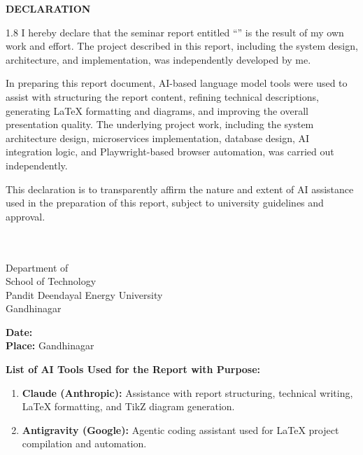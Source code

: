 \thispagestyle{empty}

\begin{center}
{\Large \textbf{DECLARATION}}
\end{center}

\vspace{1.0cm}

\begin{spacing}{1.8}
\noindent
I hereby declare that the seminar report entitled ``\projecttitle'' is the result of my own work and effort. The project described in this report, including the system design, architecture, and implementation, was independently developed by me.

\vspace{0.5cm}

\noindent
In preparing this report document, AI-based language model tools were used to assist with structuring the report content, refining technical descriptions, generating \LaTeX{} formatting and diagrams, and improving the overall presentation quality. The underlying project work, including the system architecture design, microservices implementation, database design, AI integration logic, and Playwright-based browser automation, was carried out independently.

\vspace{0.5cm}

\noindent
This declaration is to transparently affirm the nature and extent of AI assistance used in the preparation of this report, subject to university guidelines and approval.
\end{spacing}

\vspace{1.5cm}

\noindent
\textbf{\studentname} \\
\rollnumber \\
Department of \department \\
School of Technology \\
Pandit Deendayal Energy University \\
Gandhinagar

\vspace{1.0cm}

\noindent
\textbf{Date:} \hrulefill \\[0.4cm]
\textbf{Place:} Gandhinagar

\vspace{1.0cm}

\noindent
\textbf{List of AI Tools Used for the Report with Purpose:}

\begin{enumerate}[leftmargin=2cm]
  \item \textbf{Claude (Anthropic):} Assistance with report structuring, technical writing, \LaTeX{} formatting, and TikZ diagram generation.
  \item \textbf{Antigravity (Google):} Agentic coding assistant used for \LaTeX{} project compilation and automation.
\end{enumerate}
